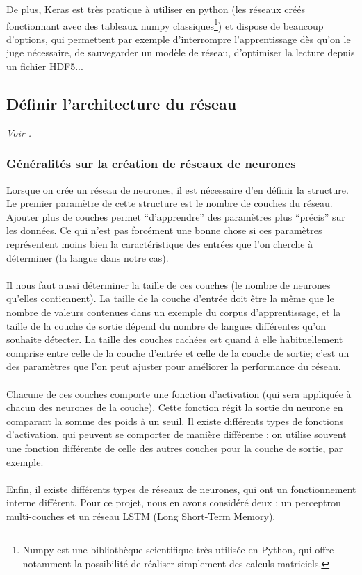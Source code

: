 \documentclass{article}
\begin{document}
De plus, Keras est très pratique à utiliser en python (les réseaux créés fonctionnant avec des tableaux numpy classiques\footnote{Numpy est une bibliothèque scientifique très utilisée en Python, qui offre notamment la possibilité de réaliser simplement des calculs matriciels.}) et dispose de beaucoup d'options, qui permettent par exemple d'interrompre l'apprentissage dès qu'on le juge nécessaire, de sauvegarder un modèle de réseau, d'optimiser la lecture depuis un fichier HDF5...

\subsection{Définir l'architecture du réseau}

\textit{Voir \cite{lecun2015}.}

\subsubsection{Généralités sur la création de réseaux de neurones}
Lorsque on crée un réseau de neurones, il est nécessaire d'en définir la structure. Le premier paramètre de cette structure est le nombre de couches du réseau. Ajouter plus de couches permet ``d'apprendre'' des paramètres plus ``précis'' sur les données. Ce qui n'est pas forcément une bonne chose si ces paramètres représentent moins bien la caractéristique des entrées que l'on cherche à déterminer (la langue dans notre cas).\\
 \\
Il nous faut aussi déterminer la taille de ces couches (le nombre de neurones qu'elles contiennent). La taille de la couche d'entrée doit être la même que le nombre de valeurs contenues dans un exemple du corpus d'apprentissage, et la taille de la couche de sortie dépend du nombre de langues différentes qu'on souhaite détecter. La taille des couches cachées est quand à elle habituellement comprise entre celle de la couche d'entrée et celle de la couche de sortie; c'est un des paramètres que l'on peut ajuster pour améliorer la performance du réseau.\\
 \\
Chacune de ces couches comporte une fonction d'activation (qui sera appliquée à chacun des neurones de la couche). Cette fonction régit la sortie du neurone en comparant la somme des poids à un seuil. Il existe différents types de fonctions d'activation, qui peuvent se comporter de manière différente : on utilise souvent une fonction différente de celle des autres couches pour la couche de sortie, par exemple.\\
 \\
Enfin, il existe différents types de réseaux de neurones, qui ont un fonctionnement interne différent.  Pour ce projet, nous en avons considéré deux : un perceptron multi-couches et un réseau LSTM (Long Short-Term Memory).
 
\end{document}
